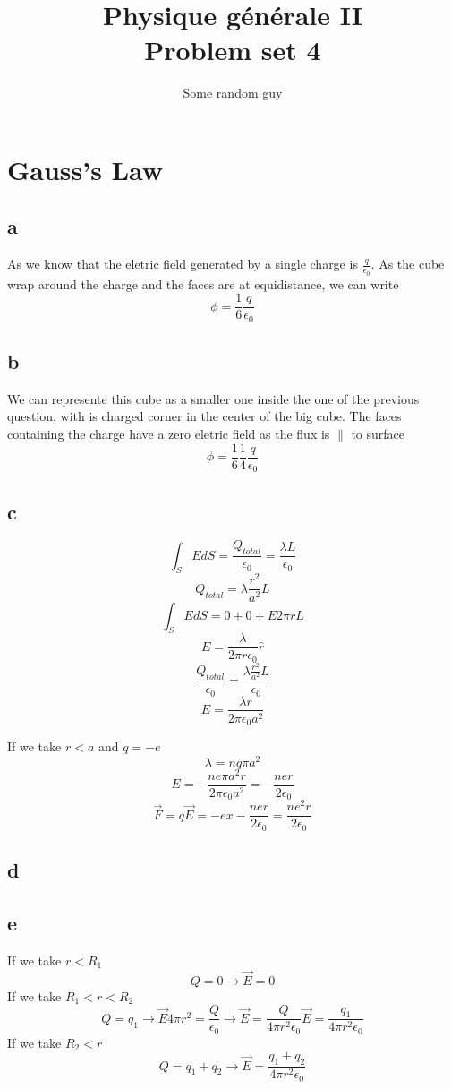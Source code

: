\documentclass{article}
\begin{document}
\title{Physique g\'en\'erale II\\
Problem set 4}
\author{Some random guy}
\maketitle

\section{Gauss’s Law}

\subsection{a}
As we know that the eletric field generated by a single charge is
\(\frac{q}{\epsilon_0}\). As the cube wrap around the charge and the faces
are at equidistance, we can write
\[
	\phi = \frac{1}{6} \frac{q}{\epsilon_0}
\]

\subsection{b}
We can represente this cube as a smaller one inside the one of the previous
question, with is charged corner in the center of the big cube. The faces
containing the charge have a zero eletric field as the flux is \(\parallel\) to
surface
\[
	\phi = \frac{1}{6} \frac{1}{4} \frac{q}{\epsilon_0}
\]

\subsection{c}
\[
	\int_S E dS = \frac{Q_{total}}{\epsilon_0} = \frac{\lambda L}{\epsilon_0}
\]
\[
	Q_{total} = \lambda \frac{r^2}{a^2} L
\]
\[
	\int_S E dS = 0 + 0 + E 2 \pi r L
\]
\[
	E = \frac{\lambda}{2 \pi r \epsilon_0} \hat{r}
\]
\[
	\frac{Q_{total}}{\epsilon_0}
	= \frac{\lambda \frac{r^2}{a^2} L}{\epsilon_0}
\]
\[
	E = \frac{\lambda r}{2 \pi \epsilon_0 a^2}
\]

If we take \(r < a\) and \(q = -e\)
\[
	\lambda = n q \pi a^2
\]
\[
	E = - \frac{n e \pi a^2 r}{2 \pi \epsilon_0 a^2}
	= - \frac{n e r}{2 \epsilon_0}
\]
\[
	\vec{F} = q \vec{E} = - e x - \frac{n e r}{2 \epsilon_0}
	= \frac{n e^2 r}{2 \epsilon_0}
\]

\subsection{d}

\subsection{e}
If we take \(r < R_1\)
\[
	Q = 0 \to \vec{E} = 0
\]
If we take \(R_1 < r < R_2\)
\[
	Q = q_1 \to
	\vec{E} 4 \pi r^2 = \frac{Q}{\epsilon_0} \to
	\vec{E} = \frac{Q}{4 \pi r^2 \epsilon_0}
	\vec{E} = \frac{q_1}{4 \pi r^2 \epsilon_0}
\]
If we take \(R_2 < r\)
\[
	Q = q_1 + q_2 \to
	\vec{E} = \frac{q_1 + q_2}{4 \pi r^2 \epsilon_0}
\]
\end{document}
